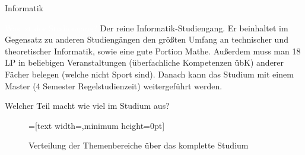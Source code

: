 
\begin{Huge}
    Informatik
\end{Huge}
\begin{exampleblock}{\textcolor{white}{Was ist der Studiengang?}}
    Der reine Informatik-Studiengang. Er beinhaltet im Gegensatz zu anderen Studiengängen den größten Umfang an technischer und theoretischer Informatik, sowie eine gute Portion Mathe. Außerdem muss man 18 LP in beliebigen Veranstaltungen (überfachliche Kompetenzen übK) anderer Fächer belegen (welche nicht Sport sind). Danach kann das Studium mit einem Master (4 Semester Regelstudienzeit) weitergeführt werden.
\end{exampleblock}	

\begin{block}{Welcher Teil macht wie viel im Studium aus?}
    \begin{figure}[h!]
        \begin{minipage}{\linewidth}
            \centering
            =[text width={},minimum height=0pt]
        \end{minipage}
        
        \caption{Verteilung der Themenbereiche über das komplette Studium}
    \end{figure}	
\end{block}%


